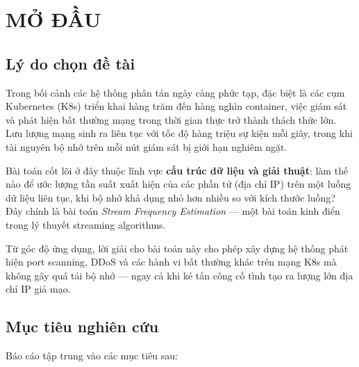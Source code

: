 
\chapter*{MỞ ĐẦU}
{}

\section*{Lý do chọn đề tài}


Trong bối cảnh các hệ thống phân tán ngày càng phức tạp, đặc biệt là các cụm Kubernetes (K8s) triển khai hàng trăm đến hàng nghìn container, việc giám sát và phát hiện bất thường mạng trong thời gian thực trở thành thách thức lớn. Lưu lượng mạng sinh ra liên tục với tốc độ hàng triệu sự kiện mỗi giây, trong khi tài nguyên bộ nhớ trên mỗi nút giám sát bị giới hạn nghiêm ngặt.

Bài toán cốt lõi ở đây thuộc lĩnh vực \textbf{cấu trúc dữ liệu và giải thuật}: làm thế nào để ước lượng tần suất xuất hiện của các phần tử (địa chỉ IP) trên một luồng dữ liệu liên tục, khi bộ nhớ khả dụng nhỏ hơn nhiều so với kích thước luồng? Đây chính là bài toán \textit{Stream Frequency Estimation} — một bài toán kinh điển trong lý thuyết streaming algorithms.

Từ góc độ ứng dụng, lời giải cho bài toán này cho phép xây dựng hệ thống phát hiện port scanning, DDoS và các hành vi bất thường khác trên mạng K8s mà không gây quá tải bộ nhớ — ngay cả khi kẻ tấn công cố tình tạo ra lượng lớn địa chỉ IP giả mạo.

\section*{Mục tiêu nghiên cứu}

Báo cáo tập trung vào các mục tiêu sau:

